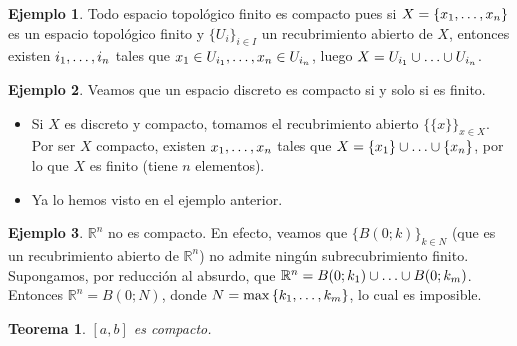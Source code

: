 \documentclass[12pt]{report}
\newtheorem{theorem}{Teorema}[chapter]
\theoremstyle{definition}
\theoremstyle{definition}
\newtheorem{example}{Ejemplo}[chapter]
\theoremstyle{remark}
\newcommand{\R}{\mathbb R}
\begin{document}
\vspace{2mm}
\begin{example}
Todo espacio topológico finito es compacto pues si $X = \{x_1,\mathellipsis,x_n\}$ es un espacio topológico finito y $\{U_i\}_{i \in I}$ un recubrimiento abierto de $X$, entonces existen $i_1,\mathellipsis,i_n$ tales que $x_1 \in U_{i_1},\mathellipsis,x_n \in U_{i_n}$, luego $X = U_{i_1} \cup \mathellipsis \cup U_{i_n}$.    
\end{example}
\begin{example}
Veamos que un espacio discreto es compacto si y solo si es finito.
\begin{itemize}
    \item[{\fbox[rb]{$\Rightarrow$}}] Si $X$ es discreto y compacto, tomamos el recubrimiento abierto $\{\{x\}\}_{x \in X}$. Por ser $X$ compacto, existen $x_1,\mathellipsis,x_n$ tales que $X = \{x_1\} \cup \mathellipsis \cup \{x_n\}$, por lo que $X$ es finito (tiene $n$ elementos).
    \item[{\fbox[rb]{$\Leftarrow$}}] Ya lo hemos visto en el ejemplo anterior.
\end{itemize}
\end{example}

\begin{example}
$\R^n$ no es compacto. En efecto, veamos que $\{B(0;k)\}_{k \in N}$ (que es un recubrimiento abierto de $\R^n$) no admite ningún subrecubrimiento finito. Supongamos, por reducción al absurdo, que $\R^n = B(0;k_1) \cup \mathellipsis \cup B(0;k_m)$. Entonces $\R^n = B(0;N)$, donde $N = \max{\{k_1,\mathellipsis,k_m\}}$, lo cual es imposible. 
\end{example}

\vspace{2mm}
\begin{theorem}
$[a,b]$ es compacto.    
\end{theorem}
\end{document}
